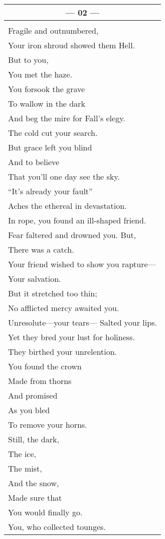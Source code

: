 \documentclass{article}
\begin{document}
\begin{center}
\begin{tabular}{l}
\multicolumn{1}{c}{\textbf{--- 02 ---}} \\ \hline
\\
Fragile and outnumbered, \\
Your iron shroud showed them Hell. \\
But to you, \\
You met the haze. \\
You forsook the grave \\
To wallow in the dark \\
And beg the mire for Fall's elegy. \\
The cold cut your search. \\
But grace left you blind \\
And to believe \\
That you'll one day see the sky. \\
``It's already your fault'' \\
Aches the ethereal in devastation. \\
In rope, you found an ill-shaped friend. \\
Fear faltered and drowned you. But, \\
There was a catch. \\
Your friend wished to show you rapture--- \\
Your salvation. \\
But it stretched too thin; \\
No afflicted mercy awaited you. \\
Unresolute---your tears---
Salted your lips. \\
Yet they bred your lust for holiness. \\
They birthed your unrelention. \\
You found the crown \\
Made from thorns \\
And promised \\
As you bled \\
To remove your horns. \\
Still, the dark, \\
The ice, \\
The mist, \\
And the snow, \\
Made sure that \\
You would finally go. \\
You, who collected tounges. \\

\end{tabular}
\end{center}
\end{document}
